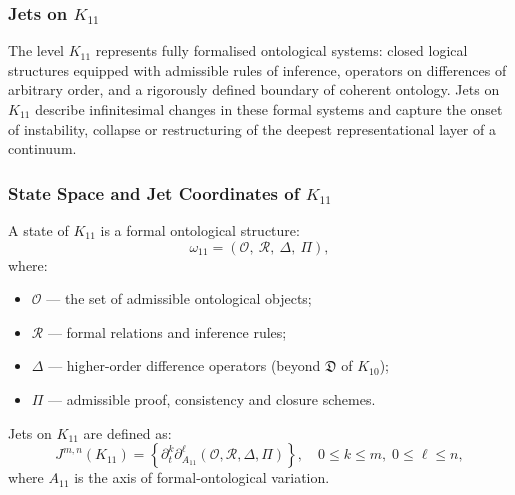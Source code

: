 
\subsubsection{Jets on $K_{11}$}
\label{sec:jets-k11}

The level $K_{11}$ represents fully formalised ontological systems:
closed logical structures equipped with admissible rules of inference,
operators on differences of arbitrary order, and a rigorously defined
boundary of coherent ontology. Jets on $K_{11}$ describe infinitesimal
changes in these formal systems and capture the onset of instability,
collapse or restructuring of the deepest representational layer of a
continuum.


\subsubsection{State Space and Jet Coordinates of $K_{11}$}

A state of $K_{11}$ is a formal ontological structure:
\[
\omega_{11}
=
(\mathcal{O},\ \mathcal{R},\ \Delta,\ \Pi),
\]
where:
\begin{itemize}
    \item $\mathcal{O}$ — the set of admissible ontological objects;
    \item $\mathcal{R}$ — formal relations and inference rules;
    \item $\Delta$ — higher-order difference operators
                     (beyond $\mathfrak{D}$ of $K_{10}$);
    \item $\Pi$ — admissible proof, consistency and closure schemes.
\end{itemize}

Jets on $K_{11}$ are defined as:
\[
J^{m,n}(K_{11}) =
\left\{
\partial_t^k\partial_{A_{11}}^\ell
(\mathcal{O},\mathcal{R},\Delta,\Pi)
\right\},
\quad
0\le k\le m,\; 0\le\ell\le n,
\]
where $A_{11}$ is the axis of formal-ontological variation.


